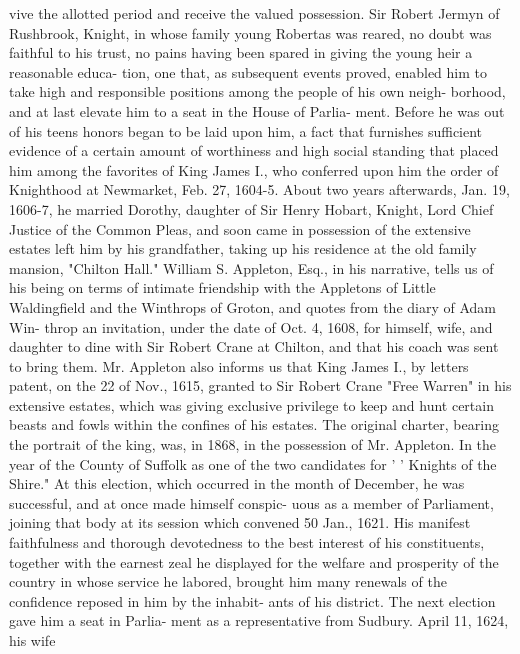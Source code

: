 \documentclass[oneside]{book}
\begin{document}
vive the allotted period and receive the valued possession. Sir 
Robert Jermyn of Rushbrook, Knight, in whose family young 
Robertas was reared, no doubt was faithful to his trust, no pains 
having been spared in giving the young heir a reasonable educa- 
tion, one that, as subsequent events proved, enabled him to take 
high and responsible positions among the people of his own neigh- 
borhood, and at last elevate him to a seat in the House of Parlia- 
ment. Before he was out of his teens honors began to be laid 
upon him, a fact that furnishes sufficient evidence of a certain 
amount of worthiness and high social standing that placed him 
among the favorites of King James I., who conferred upon him 
the order of Knighthood at Newmarket, Feb. 27, 1604-5. About 
two years afterwards, Jan. 19, 1606-7, he married Dorothy, 
daughter of Sir Henry Hobart, Knight, Lord Chief Justice of the 
Common Pleas, and soon came in possession of the extensive 
estates left him by his grandfather, taking up his residence at the 
old family mansion, "Chilton Hall." William S. Appleton, 
Esq., in his narrative, tells us of his being on terms of intimate 
friendship with the Appletons of Little Waldingfield and the 
Winthrops of Groton, and quotes from the diary of Adam Win- 
throp an invitation, under the date of Oct. 4, 1608, for himself, 
wife, and daughter to dine with Sir Robert Crane at Chilton, and 
that his coach was sent to bring them. Mr. Appleton also 
informs us that King James I., by letters patent, on the 22 of 
Nov., 1615, granted to Sir Robert Crane "Free Warren" in his 
extensive estates, which was giving exclusive privilege to keep 
and hunt certain beasts and fowls within the confines of his 
estates. The original charter, bearing the portrait of the king, 
was, in 1868, in the possession of Mr. Appleton. In the year 
of the County of Suffolk as one of the two candidates for ' ' Knights 
of the Shire." At this election, which occurred in the month of 
December, he was successful, and at once made himself conspic- 
uous as a member of Parliament, joining that body at its session 
which convened 50 Jan., 1621. His manifest faithfulness and 
thorough devotedness to the best interest of his constituents, 
together with the earnest zeal he displayed for the welfare and 
prosperity of the country in whose service he labored, brought 
him many renewals of the confidence reposed in him by the inhabit- 
ants of his district. The next election gave him a seat in Parlia- 
ment as a representative from Sudbury. April 11, 1624, his wife 
\end{document}
